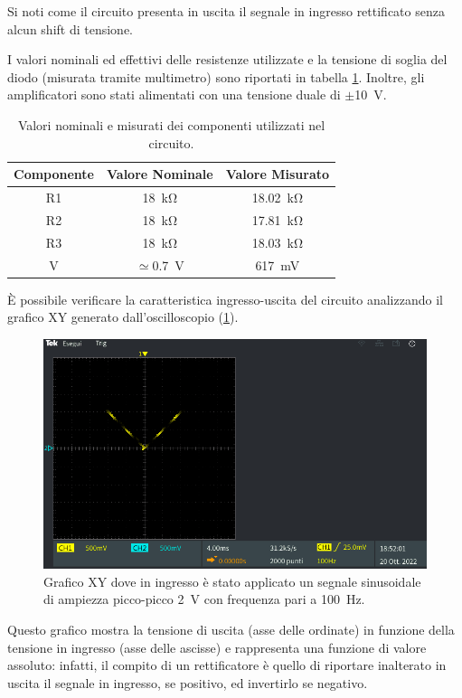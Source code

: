 Si noti come il circuito presenta in uscita il segnale in ingresso rettificato senza alcun shift di tensione. 

\noindent
I valori nominali ed effettivi delle resistenze utilizzate e la tensione di soglia del diodo (misurata tramite multimetro) sono riportati in tabella \ref{tab:valori_componenti_1}. Inoltre, gli amplificatori sono stati alimentati con una tensione duale di $\pm$\SI{10}{\volt}.

\def\arraystretch{1.3}
\begin{table}[h]
	\centering
	\begin{tabular}{|c|c|c|}
		\hline
		Componente	& Valore Nominale & Valore Misurato \\ \hline
		R1 &\SI{18}{\kilo\ohm} & \SI{18,02}{\kilo\ohm} \\ \hline
		R2 &\SI{18}{\kilo\ohm} & \SI{17,81}{\kilo\ohm} \\ \hline
		R3 &\SI{18}{\kilo\ohm} & \SI{18,03}{\kilo\ohm} \\ \hline
		V\sub{D} & $\simeq$\SI{0.7}{\volt} & \SI{617}{\milli\volt} \\ \hline
	\end{tabular}
	\caption{Valori nominali e misurati dei componenti utilizzati nel circuito.}
	\label{tab:valori_componenti_1}
\end{table}

\noindent
\`E possibile verificare la caratteristica ingresso-uscita del circuito analizzando il grafico XY generato dall'oscilloscopio (\Fig\ref{fig:xy_circuito_1}). 
\begin{figure}[tbh]
	\centering
	\includegraphics[width=\linewidth]{./ImageFiles/Laboratorio 3/TEK00000.PNG}
	\caption{Grafico XY dove in ingresso è stato applicato un segnale sinusoidale di ampiezza picco-picco \SI{2}{\volt} con frequenza pari a \SI{100}{\hertz}.}
	\label{fig:xy_circuito_1}
\end{figure}
Questo grafico mostra la tensione di uscita (asse delle ordinate) in funzione della tensione in ingresso (asse delle ascisse) e rappresenta una funzione di valore assoluto: infatti, il compito di un rettificatore è quello di riportare inalterato in uscita il segnale in ingresso, se positivo, ed invertirlo se negativo.

